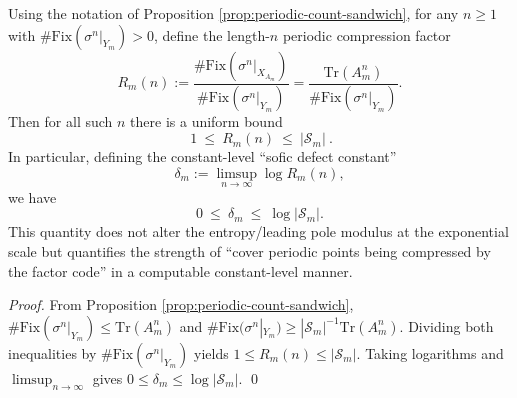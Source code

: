 \begin{corollary}\label{cor:Ym-periodic-compression-ratio}
Using the notation of Proposition \ref{prop:periodic-count-sandwich}, for any \(n\ge 1\) with \(\#\mathrm{Fix}(\sigma^n|_{Y_m})>0\), define the length-\(n\) periodic compression factor
\[
R_m(n):=\frac{\#\mathrm{Fix}(\sigma^n|_{X_{A_m}})}{\#\mathrm{Fix}(\sigma^n|_{Y_m})}
=\frac{\mathrm{Tr}(A_m^n)}{\#\mathrm{Fix}(\sigma^n|_{Y_m})}.
\]
Then for all such \(n\) there is a uniform bound
\[
\boxed{\ 1\ \le\ R_m(n)\ \le\ |\mathcal{S}_m|\ }.
\]
In particular, defining the constant-level ``sofic defect constant''
\[
\delta_m:=\limsup_{n\to\infty}\log R_m(n),
\]
we have
\[
0\ \le\ \delta_m\ \le\ \log|\mathcal{S}_m|.
\]
This quantity does not alter the entropy/leading pole modulus at the exponential scale but quantifies the strength of ``cover periodic points being compressed by the factor code'' in a computable constant-level manner.
\end{corollary}

\begin{proof}
From Proposition \ref{prop:periodic-count-sandwich},
\(
\#\mathrm{Fix}(\sigma^n|_{Y_m})\le \mathrm{Tr}(A_m^n)
\)
and
\(
\#\mathrm{Fix}(\sigma^n|_{Y_m})\ge |\mathcal{S}_m|^{-1}\mathrm{Tr}(A_m^n)
\).
Dividing both inequalities by \(\#\mathrm{Fix}(\sigma^n|_{Y_m})\) yields \(1\le R_m(n)\le |\mathcal{S}_m|\).
Taking logarithms and \(\limsup_{n\to\infty}\) gives \(0\le \delta_m\le \log|\mathcal{S}_m|\). \qed
\end{proof}

